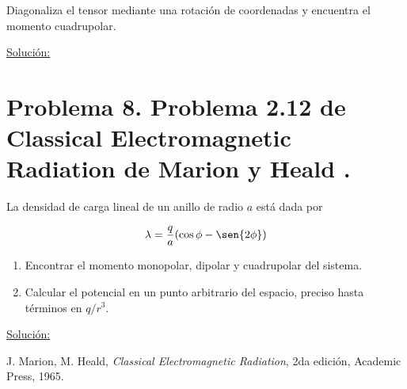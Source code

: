 \documentclass[a4paper,11pt]{article}
\numberwithin{equation}{section}
\begin{document}
Diagonaliza el tensor mediante una rotación de coordenadas y encuentra el momento
cuadrupolar.

\vspace{.3cm}

\underline{Solución:} \vspace{.3cm}

\section{Problema 8. Problema 2.12 de Classical Electromagnetic Radiation
de Marion y Heald \cite{marion2}.}

La densidad de carga lineal de un anillo de radio $a$ está dada por 

$$
\lambda = \frac{q}{a}(\cos{\phi} - \sen{2\phi})
$$

\begin{enumerate}[label=\textbf{(\alph*)}]
\item Encontrar el momento monopolar, dipolar y cuadrupolar del sistema.
\item Calcular el potencial en un punto arbitrario del espacio, preciso hasta 
términos en $q/r^3$.
\end{enumerate}

\vspace{.3cm}

\underline{Solución:} \vspace{.3cm}

\begin{thebibliography}{10}
J. Marion, M. Heald, \emph{Classical Electromagnetic Radiation}, 2da edición, Academic 
Press, 1965.
\end{thebibliography}
\end{document}
